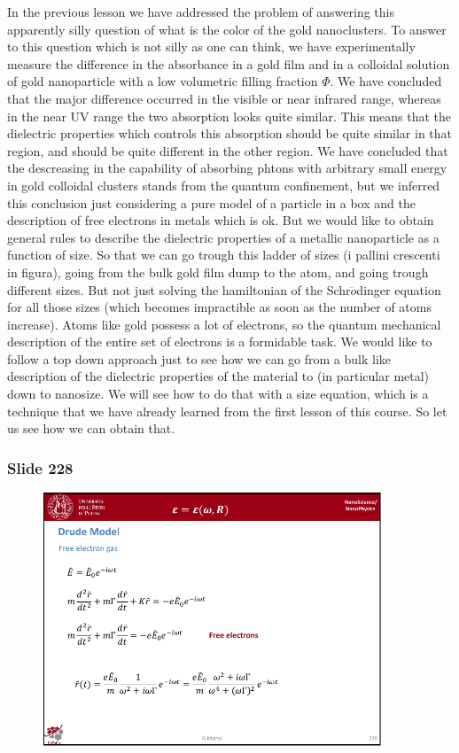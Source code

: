 \documentclass[../main/main.tex]{subfiles}
\begin{document}
In the previous lesson we have addressed the problem of answering this apparently silly question of what is the color of the gold nanoclusters. To answer to this question which is not silly as one can think, we have experimentally measure the difference in the absorbance in a gold film and in a colloidal solution of gold nanoparticle with a low volumetric filling fraction \( \Phi  \). We have concluded that the major difference occurred in the visible or near infrared range, whereas in the near UV range the two absorption looks quite similar. This means that the dielectric properties which controls this absorption should be quite similar in that region, and should be quite different in the other region. We have concluded that the descreasing in the capability of absorbing phtons with arbitrary small energy in gold colloidal clusters stands from the quantum confinement, but we inferred this conclusion just considering a pure model of a particle in a box and the description of free electrons in metals which  is ok. But we would like to obtain general rules to describe the dielectric properties of a metallic nanoparticle as a function of size. So that we can go trough this ladder of sizes (i pallini crescenti in figura), going from the bulk gold film dump to the atom, and going trough different sizes. But not just solving the hamiltonian of the Schr$\ddot{o}$dinger equation for all those sizes (which becomes impractible as soon as the number of atoms increase). Atoms like gold possess a lot of electrons, so the quantum mechanical description of the entire set of electrons is a formidable task. We would like to follow a top down approach just to see how we can go from a bulk like description of the dielectric properties of the material to (in particular metal) down to nanosize. We will see how to do that with a size equation, which is a technique that we have already learned from the first lesson of this course. So let us see how we can obtain that.

\newpage
\subsubsection{Slide 228}

\begin{figure}[h!]
\centering
\includegraphics[page=1,width=0.9\textwidth]{../lessons/pdf_file/15_lesson.pdf}
\end{figure}
\end{document}
